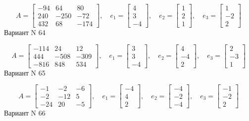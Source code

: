 \documentclass[11pt]{report}
\begin{document}
$$A = \left[\begin{matrix}-94 & 64 & 80\\240 & -250 & -72\\432 & 68 & -174\end{matrix}\right],\quad e_1 = \left[\begin{matrix}4\\3\\-4\end{matrix}\right],\quad e_2 = \left[\begin{matrix}1\\2\\1\end{matrix}\right],\quad e_3 = \left[\begin{matrix}1\\-2\\2\end{matrix}\right]$$Вариант N 64

$$A = \left[\begin{matrix}-114 & 24 & 12\\444 & -508 & -309\\-816 & 848 & 534\end{matrix}\right],\quad e_1 = \left[\begin{matrix}3\\3\\-4\end{matrix}\right],\quad e_2 = \left[\begin{matrix}4\\-4\\2\end{matrix}\right],\quad e_3 = \left[\begin{matrix}2\\-3\\1\end{matrix}\right]$$Вариант N 65

$$A = \left[\begin{matrix}-1 & -2 & -6\\-2 & -12 & 5\\-24 & 20 & -5\end{matrix}\right],\quad e_1 = \left[\begin{matrix}-4\\4\\2\end{matrix}\right],\quad e_2 = \left[\begin{matrix}-4\\-2\\-4\end{matrix}\right],\quad e_3 = \left[\begin{matrix}-1\\-2\\2\end{matrix}\right]$$Вариант N 66
\end{document}
